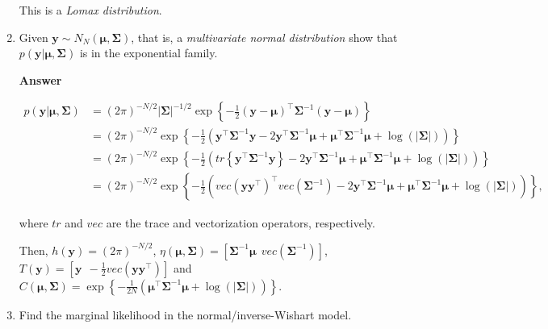 \begin{enumerate}[leftmargin=*]
This is a \textit{Lomax distribution}.

\item Given $\mathbf{y}\sim N_N(\mathbf{\mu},\mathbf{\mathbf{\mathbf{\Sigma}}})$, that is, a \textit{multivariate normal distribution} show that $p(\mathbf{y}|\mathbf{\mu},\mathbf{\mathbf{\mathbf{\Sigma}}})$ is in the exponential family.

\textbf{Answer} 

\begin{align}
	p(\mathbf{y}|\mathbf{\mu},\mathbf{\mathbf{\mathbf{\Sigma}}})&= (2\pi)^{-N/2}|\mathbf{\mathbf{\Sigma}}|^{-1/2}\exp\left\{-\frac{1}{2}\left(\mathbf{y}-\mathbf{\mu}\right)^{\top}\mathbf{\mathbf{\mathbf{\Sigma}}}^{-1}\left(\mathbf{y}-\mathbf{\mu}\right)\right\}\nonumber\\
	&= (2\pi)^{-N/2}\exp\left\{-\frac{1}{2}\left(\mathbf{y}^{\top}\mathbf{\mathbf{\Sigma}}^{-1}\mathbf{y}-2\mathbf{y}^{\top}\mathbf{\mathbf{\Sigma}}^{-1}\mathbf{\mu}+\mathbf{\mu}^{\top}\mathbf{\mathbf{\Sigma}}^{-1}\mathbf{\mu}+\log(|\mathbf{\Sigma}|)\right)\right\}\nonumber\\
	&= (2\pi)^{-N/2}\exp\left\{-\frac{1}{2}\left(tr\left\{\mathbf{y}^{\top}\mathbf{\mathbf{\Sigma}}^{-1}\mathbf{y}\right\}-2\mathbf{y}^{\top}\mathbf{\mathbf{\Sigma}}^{-1}\mathbf{\mu}+\mathbf{\mu}^{\top}\mathbf{\mathbf{\Sigma}}^{-1}\mathbf{\mu}+\log(|\mathbf{\Sigma}|)\right)\right\}\nonumber\\
	&= (2\pi)^{-N/2}\exp\left\{-\frac{1}{2}\left(vec\left(\mathbf{y}\mathbf{y}^{\top}\right)^{\top}vec\left(\mathbf{\mathbf{\Sigma}}^{-1}\right)-2\mathbf{y}^{\top}\mathbf{\mathbf{\Sigma}}^{-1}\mathbf{\mu}+\mathbf{\mu}^{\top}\mathbf{\mathbf{\Sigma}}^{-1}\mathbf{\mu}+\log(|\mathbf{\Sigma}|)\right)\right\} \nonumber, 	
\end{align}

where $tr$ and $vec$ are the trace and vectorization operators, respectively. 

Then, $h(\mathbf{y})=(2\pi)^{-N/2}$, $\eta(\mathbf{\mu},\mathbf{\mathbf{\Sigma}})=\left[\mathbf{\mathbf{\Sigma}}^{-1}\mathbf{\mu} \ \ vec\left(\mathbf{\mathbf{\Sigma}}^{-1}\right)\right]$, $T(\mathbf{y})=\left[\mathbf{y} \ \ -\frac{1}{2}vec(\mathbf{y}\mathbf{y}^{\top})\right]$ and $C(\mathbf{\mu},\mathbf{\mathbf{\Sigma}})=\exp\left\{-\frac{1}{2N}\left(\mathbf{\mu}^{\top}\mathbf{\mathbf{\Sigma}}^{-1}\mathbf{\mu}+\log(|\mathbf{\Sigma}|)\right)\right\}$.
	
\item Find the marginal likelihood in the normal/inverse-Wishart model.


\end{enumerate}
